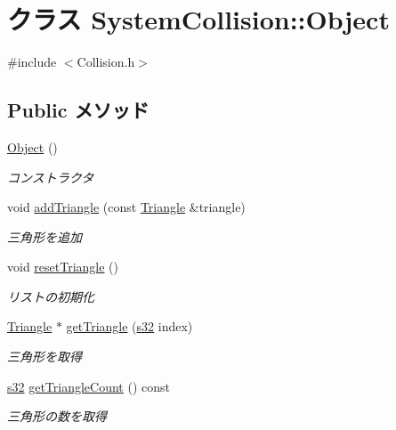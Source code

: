\hypertarget{class_system_collision_1_1_object}{\section{クラス System\-Collision\-:\-:Object}
\label{class_system_collision_1_1_object}
}


{\ttfamily \#include $<$Collision.\-h$>$}

\subsection*{Public メソッド}
\begin{DoxyCompactItemize}
\item 
\hyperlink{class_system_collision_1_1_object_adf26ef840a79aa5ef9263a3acfb3cfed}{Object} ()
\begin{DoxyCompactList}\small\item\em コンストラクタ \end{DoxyCompactList}\item 
void \hyperlink{class_system_collision_1_1_object_ac707b4d5b0a943783dfb7d838811dc44}{add\-Triangle} (const \hyperlink{struct_triangle}{Triangle} \&triangle)
\begin{DoxyCompactList}\small\item\em 三角形を追加 \end{DoxyCompactList}\item 
void \hyperlink{class_system_collision_1_1_object_abdf94c891a1831b034ef95676260e810}{reset\-Triangle} ()
\begin{DoxyCompactList}\small\item\em リストの初期化 \end{DoxyCompactList}\item 
\hyperlink{struct_triangle}{Triangle} $\ast$ \hyperlink{class_system_collision_1_1_object_a20589d2a42528e7ef1b05943e791b613}{get\-Triangle} (\hyperlink{_main_8h_a0ce6887c26c1c49ad3be5710dd42bfd6}{s32} index)
\begin{DoxyCompactList}\small\item\em 三角形を取得 \end{DoxyCompactList}\item 
\hyperlink{_main_8h_a0ce6887c26c1c49ad3be5710dd42bfd6}{s32} \hyperlink{class_system_collision_1_1_object_a69ccd0e81eec2940e9147c917b52c28a}{get\-Triangle\-Count} () const 
\begin{DoxyCompactList}\small\item\em 三角形の数を取得 \end{DoxyCompactList}\end{DoxyCompactItemize}


